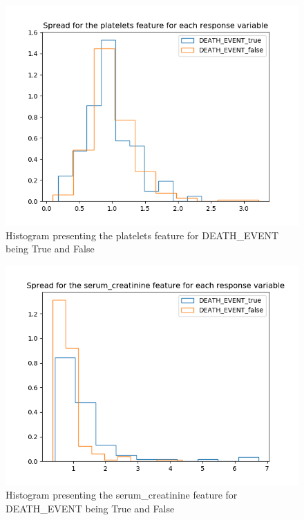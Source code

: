 \documentclass[a4paper, UKenglish]{article}
\newcommand{\0}{\mathbf{0}}
\newcommand{\1}{\mathbf{1}}
\begin{document}
\begin{figure}[H]
        \centering
        \includegraphics[scale=0.6]{images/platelets.png}
        \caption{Histogram presenting the platelets feature for DEATH{\_}EVENT being True and False}
        \label{fig:platelets}
\end{figure}


\begin{figure}[H]
        \centering
        \includegraphics[scale=0.6]{images/serum_creatinine.png}
        \caption{Histogram presenting the serum{\_}creatinine feature for DEATH{\_}EVENT being True and False}
        \label{fig:serum_creatinine}
\end{figure}
\end{document}
